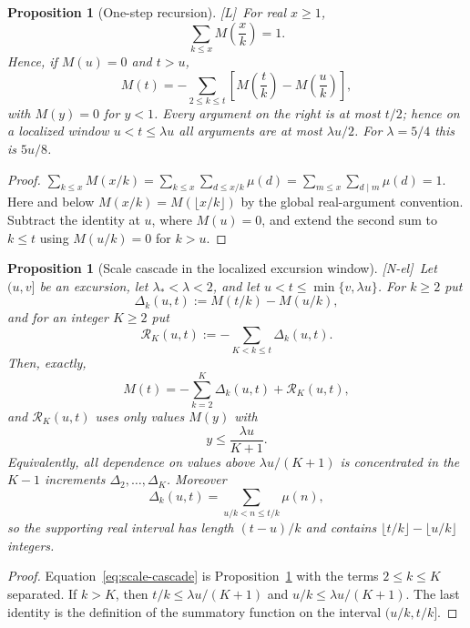 \documentclass[11pt]{amsart}
\numberwithin{equation}{section}
\theoremstyle{plain}
\newtheorem{proposition}[theorem]{Proposition}
\theoremstyle{definition}
\theoremstyle{remark}
\newcommand{\tagNE}{\textup{[N-el]}}
\newcommand{\tagL}{\textup{[L]}}
\begin{document}
\begin{proposition}[One-step recursion]
\label{prop:one-step}
\tagL\ For real $x\ge1$,
\begin{equation}
\label{eq:hyperbola-M}
\sum_{k\le x}M\!\left(\frac xk\right)=1 .
\end{equation}
Hence, if $M(u)=0$ and $t>u$,
\begin{equation}
\label{eq:descent-identity}
M(t)=-\sum_{2\le k\le t}\left[M\!\left(\frac tk\right)-M\!\left(\frac uk\right)\right],
\end{equation}
with $M(y)=0$ for $y<1$. Every argument on the right is at most $t/2$; hence on a localized
window $u<t\le\lambda u$ all arguments are at most $\lambda u/2$.  For
$\lambda=5/4$ this is $5u/8$.
\end{proposition}

\begin{proof}
$\sum_{k\le x}M(x/k)=\sum_{k\le x}\sum_{d\le x/k}\mu(d)
=\sum_{m\le x}\sum_{d\mid m}\mu(d)=1$. Here and below
$M(x/k)=M(\lfloor x/k\rfloor)$ by the global real-argument convention.
Subtract the identity at $u$, where $M(u)=0$, and extend the second sum to
$k\le t$ using $M(u/k)=0$ for $k>u$.
\end{proof}

\begin{proposition}[Scale cascade in the localized excursion window]
\label{prop:scale-cascade}
\tagNE\ Let $(u,v]$ be an excursion, let $\lambda_*<\lambda<2$, and let
$u<t\le\min\{v,\lambda u\}$.  For $k\ge2$ put
\[
\Delta_k(u,t):=M(t/k)-M(u/k),
\]
and for an integer $K\ge2$ put
\[
\mathcal R_K(u,t):=-\sum_{K<k\le t}\Delta_k(u,t).
\]
Then, exactly,
\begin{equation}
\label{eq:scale-cascade}
M(t)=-\sum_{k=2}^{K}\Delta_k(u,t)+\mathcal R_K(u,t),
\end{equation}
and $\mathcal R_K(u,t)$ uses only values $M(y)$ with
\[
y\le\frac{\lambda u}{K+1}.
\]
Equivalently, all dependence on values above $\lambda u/(K+1)$ is
concentrated in the $K-1$ increments
$\Delta_2,\ldots,\Delta_K$.  Moreover
\[
\Delta_k(u,t)=\sum_{u/k<n\le t/k}\mu(n),
\]
so the supporting real interval has length $(t-u)/k$ and contains $\lfloor t/k\rfloor-\lfloor u/k\rfloor$ integers.
\end{proposition}

\begin{proof}
Equation~\eqref{eq:scale-cascade} is Proposition~\ref{prop:one-step} with
the terms $2\le k\le K$ separated.  If $k>K$, then
$t/k\le\lambda u/(K+1)$ and $u/k\le\lambda u/(K+1)$.  The last identity is
the definition of the summatory function on the interval $(u/k,t/k]$.
\end{proof}
\end{document}
